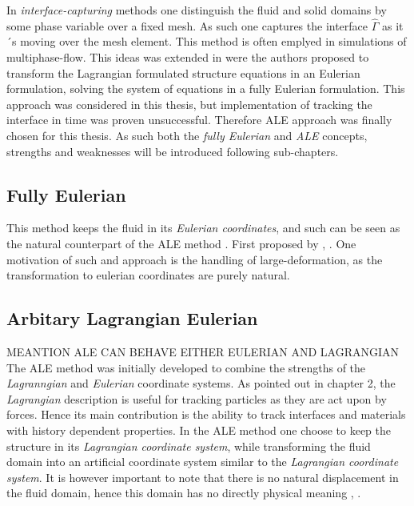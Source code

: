 In \textit{interface-capturing} methods one distinguish the fluid and solid domains by some phase variable over a fixed mesh. As such one captures the interface  $\hat{\Gamma}$ as it´s moving over the mesh element. This method is often emplyed in simulations of multiphase-flow. This ideas was extended in \cite{Dunne2006a} were the authors proposed to transform the Lagrangian formulated structure equations in an Eulerian formulation, solving the system of equations in a fully Eulerian formulation. 
This approach was considered in this thesis, but implementation of tracking the interface in time was proven unsuccessful. Therefore ALE approach was finally chosen for this thesis. As such both the \textit{fully Eulerian} and \textit{ALE} concepts, strengths and weaknesses will be introduced following sub-chapters. \\

 
\subsection{Fully Eulerian}
This method keeps the fluid in its \textit{Eulerian coordinates}, and such can be seen as the natural counterpart of the ALE method \cite{Wick2013}. First proposed by , \cite{Dunne2006}. One motivation of such and approach is the handling of large-deformation, as the transformation to eulerian coordinates are purely natural.

\subsection{Arbitary Lagrangian Eulerian}
MEANTION ALE CAN  BEHAVE EITHER EULERIAN AND LAGRANGIAN
The ALE method was initially developed to combine the strengths of the \textit{Lagranngian} and \textit{Eulerian} coordinate systems. As pointed out in chapter 2, the \textit{Lagrangian} description is useful for tracking particles as they are act upon by forces. Hence its main contribution is the ability to track interfaces and materials with history dependent properties.
In the ALE method one choose to keep the structure in its \textit{Lagrangian coordinate system}, while transforming the fluid domain into an artificial coordinate system similar to the \textit{Lagrangian coordinate system}. It is however important to note that there is no natural displacement in the fluid domain, hence this domain has no directly physical meaning \cite{Richter2010a}, \cite{Donea2004}. 
 
